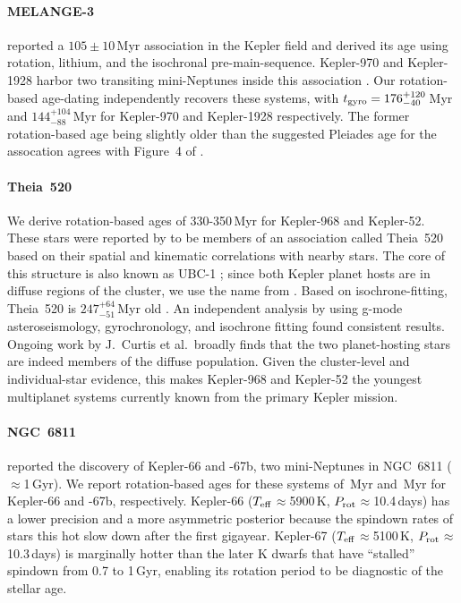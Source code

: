 \documentclass[11pt,twocolumn,tighten]{aastex63}
\begin{document}
\paragraph{MELANGE-3}
\citet{2022AJ....164...88B} reported a $105\pm10$\,Myr association in
the Kepler field and derived its age using rotation,
lithium, and the isochronal pre-main-sequence.  Kepler-970 and
Kepler-1928 harbor two transiting mini-Neptunes inside this
association \citep{2022AJ....164...88B}.  Our rotation-based
age-dating independently recovers these systems, with $t_{\rm
gyro}=176_{-40}^{+120}$\,Myr and $144_{-88}^{+104}$\,Myr for
Kepler-970 and Kepler-1928 respectively.  The former rotation-based age
being slightly older than the suggested Pleiades age for the
assocation agrees with Figure~4 of \citet{2022AJ....164...88B}.

\paragraph{Theia~520}
We derive rotation-based ages of 330-350\,Myr for Kepler-968 and Kepler-52.
These stars were reported by
\citet{2019AJ....158..122K} to be members of an association called Theia~520
based on their spatial and kinematic correlations with nearby stars.
The core of this structure is also known as UBC-1
\citep{2018A&A...618A..59C}; since both Kepler planet hosts
are in diffuse regions of the cluster, we use the name from
\citeauthor{2019AJ....158..122K}.  Based on isochrone-fitting, Theia~520
is $247^{+64}_{-51}$\,Myr old \citep{2019AJ....158..122K}.
An independent analysis by
\citet{2024A&A...681A..13F} using g-mode asteroseismology,
gyrochronology, and isochrone fitting found consistent results.
Ongoing work by J.~Curtis et al.~broadly finds that the two
planet-hosting stars are indeed members of the diffuse population.
Given the cluster-level and individual-star evidence, this makes
Kepler-968 and Kepler-52 the youngest multiplanet systems currently
known from the primary Kepler mission.

\paragraph{NGC~6811}
\citet{Meibom_2013} reported the discovery of Kepler-66 and -67b, two
mini-Neptunes in NGC~6811 ($\approx$1\,Gyr).  We report rotation-based
ages for these systems of \kepsixsixtgyro\,Myr and \kepsixseventgyro\,Myr for
Kepler-66 and -67b, respectively.  Kepler-66 ($T_{\rm
eff}$$\approx$5900\,K, $P_{\rm rot}$$\approx$10.4\,days) has a lower
precision and a more asymmetric posterior because the spindown rates
of stars this hot slow down after the first gigayear.
Kepler-67 ($T_{\rm eff}$$\approx$5100\,K, $P_{\rm
rot}$$\approx$10.3\,days) is marginally hotter than the later K dwarfs
that have ``stalled'' spindown from 0.7 to 1\,Gyr, enabling its
rotation period to be diagnostic of the stellar age.
\end{document}
